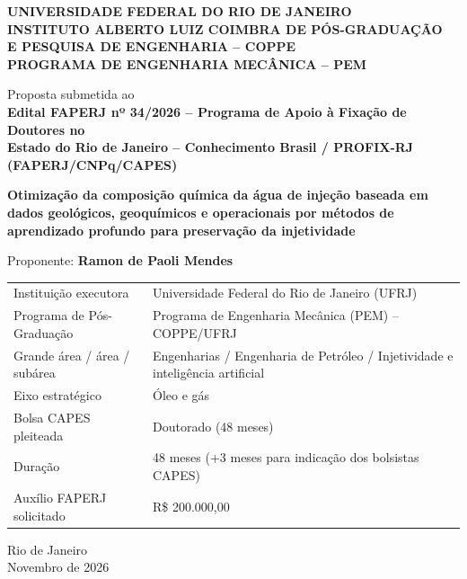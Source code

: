 \documentclass[11pt,a4paper]{article}
\begin{document}
\begin{titlepage}
\thispagestyle{empty}
\begin{center}
{\large\bfseries UNIVERSIDADE FEDERAL DO RIO DE JANEIRO\\[0.3em]
INSTITUTO ALBERTO LUIZ COIMBRA DE PÓS-GRADUAÇÃO\\ E PESQUISA DE ENGENHARIA -- COPPE\\[0.3em]
PROGRAMA DE ENGENHARIA MECÂNICA -- PEM}

\vspace{2.2cm}
{\normalsize Proposta submetida ao\\[0.3em]
\bfseries Edital FAPERJ nº 34/2026 -- Programa de Apoio à Fixação de Doutores no\\
Estado do Rio de Janeiro -- Conhecimento Brasil / PROFIX-RJ\\
(FAPERJ/CNPq/CAPES)}

\vspace{2.5cm}
{\LARGE\bfseries{}
Otimização da composição química da água de injeção baseada em dados geológicos,
geoquímicos e operacionais por métodos de aprendizado profundo para preservação da
injetividade\par}

\vspace{2.5cm}
{\large Proponente: \textbf{Ramon de Paoli Mendes}}
\end{center}

\vfill
\noindent
{\small
\begin{tabularx}{\textwidth}{@{}lX@{}}
\toprule
Instituição executora       & Universidade Federal do Rio de Janeiro (UFRJ) \\
Programa de Pós-Graduação   & Programa de Engenharia Mecânica (PEM) -- COPPE/UFRJ \\
Grande área / área / subárea & Engenharias / Engenharia de Petróleo / Injetividade e inteligência artificial \\
Eixo estratégico            & Óleo e gás \\
Bolsa CAPES pleiteada       & Doutorado (48 meses) \\
Duração                     & 48 meses (+3 meses para indicação dos bolsistas CAPES) \\
Auxílio FAPERJ solicitado   & R\$ 200.000,00 \\
\bottomrule
\end{tabularx}}

\vspace{1.5cm}
\begin{center}
Rio de Janeiro\\
Novembro de 2026
\end{center}
\end{titlepage}
\end{document}
